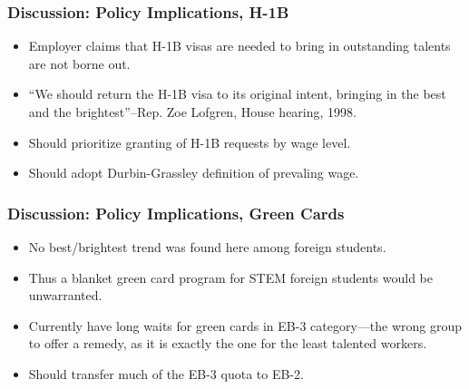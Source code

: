 \documentclass{beamer}
\begin{document}
\begin{frame}
\frametitle{Discussion:  Policy Implications, H-1B}

\pause

\begin{itemize}

   \item Employer claims that H-1B visas are needed to bring in
   outstanding talents are not borne out. \pause

   \item ``We should return the H-1B visa to its original intent,
   bringing in the best and the brightest''--Rep. Zoe Lofgren, House
   hearing, 1998.
   \pause

   \item Should prioritize granting of H-1B requests by wage level.
   \pause

   \item Should adopt Durbin-Grassley definition of prevaling wage.

\end{itemize}

\end{frame}

\begin{frame}
\frametitle{Discussion:  Policy Implications, Green Cards}

\pause

\begin{itemize}

   \item No best/brightest trend was found here among
   foreign students. \pause  
   
   \item Thus a blanket green card program for STEM foreign students
   would be unwarranted.  \pause

   \item Currently have long waits for green cards in EB-3 category---the
   wrong group to offer a remedy, as it is exactly the one for the least
   talented workers.  \pause

   \item Should transfer much of the EB-3 quota to EB-2.

\end{itemize}

\end{frame}
\end{document}
